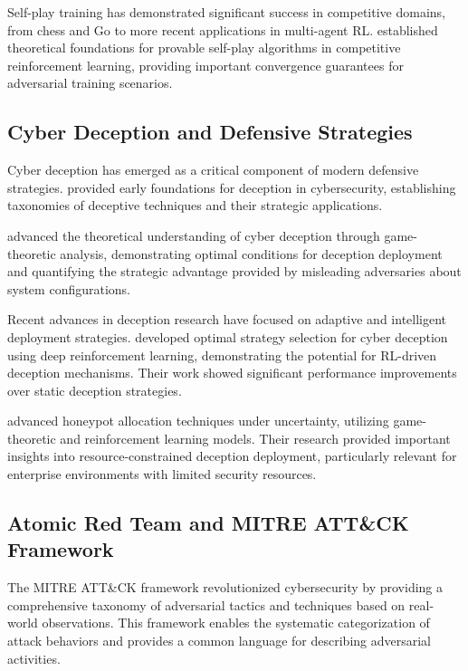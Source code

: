 Self-play training has demonstrated significant success in competitive domains, from chess and Go \citep{silver2016mastering,silver2017mastering} to more recent applications in multi-agent RL. \citet{bai2020provable} established theoretical foundations for provable self-play algorithms in competitive reinforcement learning, providing important convergence guarantees for adversarial training scenarios.

\subsection{Cyber Deception and Defensive Strategies}

Cyber deception has emerged as a critical component of modern defensive strategies. \citet{rowe2006introduction} provided early foundations for deception in cybersecurity, establishing taxonomies of deceptive techniques and their strategic applications.

\citet{carroll2011analysis} advanced the theoretical understanding of cyber deception through game-theoretic analysis, demonstrating optimal conditions for deception deployment and quantifying the strategic advantage provided by misleading adversaries about system configurations.

Recent advances in deception research have focused on adaptive and intelligent deployment strategies. \citet{zhang2022optimal} developed optimal strategy selection for cyber deception using deep reinforcement learning, demonstrating the potential for RL-driven deception mechanisms. Their work showed significant performance improvements over static deception strategies.

\citet{anwar2022honeypot} advanced honeypot allocation techniques under uncertainty, utilizing game-theoretic and reinforcement learning models. Their research provided important insights into resource-constrained deception deployment, particularly relevant for enterprise environments with limited security resources.

\subsection{Atomic Red Team and MITRE ATT\&CK Framework}

The MITRE ATT\&CK framework \citep{strom2018attack} revolutionized cybersecurity by providing a comprehensive taxonomy of adversarial tactics and techniques based on real-world observations. This framework enables the systematic categorization of attack behaviors and provides a common language for describing adversarial activities.

